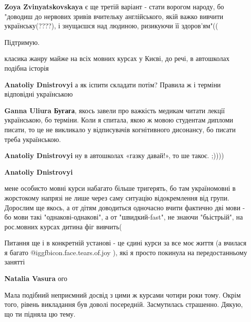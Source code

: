 \begin{itemize}
\begin{itemize}
\textbf{Zoya Zvinyatskovskaya} є ще третій варіант - стати ворогом народу, бо "доводиш до нервових зривів вчительку англійського, якій важко вивчити українську(????), і знущаєшся над людиною, ризикуючи її здоров'ям"((

\end{itemize} %

Підтримую.

класика жанру майже на всіх мовних курсах у Києві, до речі, в автошколах подібна історія

\begin{itemize} %
\textbf{Anatoliy Dnistrovyi} а як іспити складати потім? Правила ж і терміни відповідні українською

\textbf{Ganna Uliura Бугага}, якось завели про важкість медикам читати лекції українською, бо терміни. Коли я спитала, якою ж мовою студентам дипломи писати, то це не викликало у відписувачів когнітивного дисонансу, бо писати треба українською.

\textbf{Anatoliy Dnistrovyi} ну в автошколах «газку давай!», то ше такоє. ;))))

\textbf{Anatoliy Dnistrovyi} 

мене особисто мовні курси набагато більше тригерять, бо там україномовні в
жорстокому напрязі не лише через саму ситуацію відокремлення від групи.
Дорослим ще якось, а от дітям доводиться одночасно вчити фактично дві мови - бо
мови такі "однакові-однакові", а от "швидкий-fast", не знаючи "бьістрьій", на
рос.мовних курсах дитина фіг вивчить(

\end{itemize} %


Питання ще і в конкретній установі - це єдині курси за все моє життя (а вчилася
я багато  @igg{fbicon.face.tears.of.joy} ), які я просто покинула на передостанньому занятті

\begin{itemize} %
\textbf{Natalia Vasura} ого
\end{itemize} %


Мала подібний неприємний досвід з цими ж курсами чотири роки тому. Окрім того,
рівень викладання був доволі посередній. Засмутилась страшенно. Дякую, що ти
підняла цю тему.


\end{itemize}
